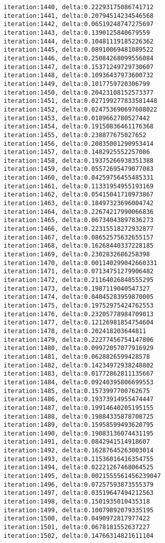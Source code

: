 \documentclass[11pt]{article}
\begin{document}
\begin{Verbatim}[commandchars=\\\{\}]
iteration:1440, delta:0.22293175086741712
iteration:1441, delta:0.20794514234546568
iteration:1442, delta:0.06519248747275697
iteration:1443, delta:0.1390125840679559
iteration:1444, delta:0.10481119185226362
iteration:1445, delta:0.08910069481089522
iteration:1446, delta:0.25084268099556084
iteration:1447, delta:0.15371249729730607
iteration:1448, delta:0.10936437973600732
iteration:1449, delta:0.1017759720306799
iteration:1450, delta:0.20423108152573377
iteration:1451, delta:0.027199277833581448
iteration:1452, delta:0.024753690697608022
iteration:1453, delta:0.0189662780527442
iteration:1454, delta:0.19150836461176368
iteration:1455, delta:0.238877675027652
iteration:1456, delta:0.20835001290953414
iteration:1457, delta:0.1482925552257086
iteration:1458, delta:0.19375266938351388
iteration:1459, delta:0.05572695479077083
iteration:1460, delta:0.04259756455485331
iteration:1461, delta:0.11331954955193169
iteration:1462, delta:0.05415041710973867
iteration:1463, delta:0.18497323696004742
iteration:1464, delta:0.22674217990066836
iteration:1465, delta:0.06734043897836273
iteration:1466, delta:0.22315518272932877
iteration:1467, delta:0.08652575632655157
iteration:1468, delta:0.16268440337228185
iteration:1469, delta:0.2302832686258398
iteration:1470, delta:0.001140299042660331
iteration:1471, delta:0.07134751279906482
iteration:1472, delta:0.21164026848555295
iteration:1473, delta:0.1987119040547327
iteration:1474, delta:0.04045283959870005
iteration:1475, delta:0.19752975424762553
iteration:1476, delta:0.23205778984709013
iteration:1477, delta:0.12126981854754604
iteration:1478, delta:0.202418203644811
iteration:1479, delta:0.22277456754147806
iteration:1480, delta:0.09972057077916929
iteration:1481, delta:0.0628826599428578
iteration:1482, delta:0.14234972938248802
iteration:1483, delta:0.01772862811135667
iteration:1484, delta:0.09240395806699553
iteration:1485, delta:0.1573997700762675
iteration:1486, delta:0.19373914955474447
iteration:1487, delta:0.19914640205195155
iteration:1488, delta:0.19884335878708725
iteration:1489, delta:0.15958599493620795
iteration:1490, delta:0.19083136074431195
iteration:1491, delta:0.0842941514918607
iteration:1492, delta:0.16287645263003014
iteration:1493, delta:0.11536016416354755
iteration:1494, delta:0.02221267468064525
iteration:1495, delta:0.0021555561456239047
iteration:1496, delta:0.07257593873555379
iteration:1497, delta:0.03519647494212563
iteration:1498, delta:0.1501935010435318
iteration:1499, delta:0.10079892079335195
iteration:1500, delta:0.0490972817977422
iteration:1501, delta:0.0678181552637227
iteration:1502, delta:0.14766314821611104

\end{Verbatim}
\end{document}
